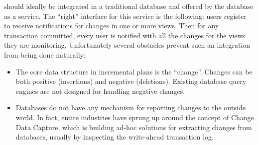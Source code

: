 \dbsp should ideally be integrated in a traditional database and
offered by the database as a service.  The ``right'' interface for
this service is the following: users register to receive notifications
for changes in one or more views.  Then for any transaction committed,
every user is notified with all the changes for the views they are
monitoring.  Unfortunately several obstacles prevent such an
integration from being done naturally:
\begin{itemize}
  \item The core data structure in incremental plans is the
    ``change''.  Changes can be both positive (insertions) and
    negative (deletions).  Existing database query engines are not
    designed for handling negative changes.
  \item Databases do not have any mechanism for reporting changes to
    the outside world.  In fact, entire industries have sprung up
    around the concept of Change Data Capture, which is building
    ad-hoc solutions for extracting changes from databases, usually by
    inspecting the write-ahead transaction log.
\end{itemize}

